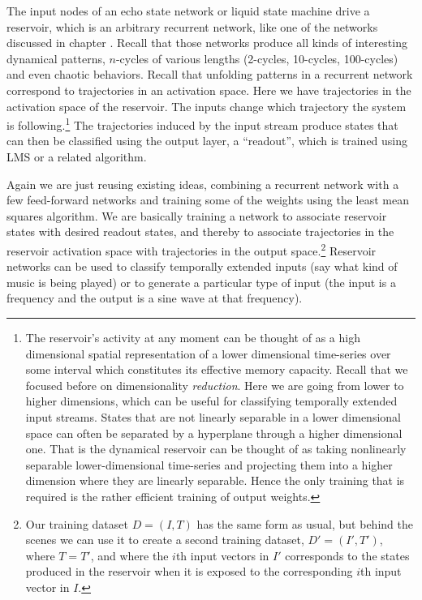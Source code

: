 
The input nodes of an echo state network or liquid state machine drive a reservoir, which is an arbitrary recurrent network, like one of the networks discussed in chapter . Recall that those networks produce all kinds of interesting dynamical patterns, \eg $n$-cycles of various lengths (2-cycles, 10-cycles, 100-cycles) and even chaotic behaviors. Recall that unfolding patterns in a recurrent network correspond to trajectories in an activation space. Here we have trajectories in the activation space of the reservoir. The inputs change which trajectory the system is following.\footnote{ The reservoir's activity at any moment can be thought of as a high dimensional spatial representation of a lower dimensional time-series over some interval which constitutes its effective memory capacity. Recall that we focused before on dimensionality \emph{reduction}. Here we are going from lower to higher dimensions, which can be useful for classifying temporally extended input streams. States that are not linearly separable in a lower dimensional space can often be separated by a hyperplane through a higher dimensional one. That is the dynamical reservoir can be thought of as taking nonlinearly separable lower-dimensional time-series and projecting them into a higher dimension where they are linearly separable. Hence the only training that is required is the rather efficient training of output weights.}  The trajectories induced by the input stream produce states that can then be classified using the output layer, a ``readout'', which is trained using LMS or a related algorithm. 

Again we are just reusing existing ideas, combining a recurrent network with a few feed-forward networks and training some of the weights using the least mean squares algorithm. We are basically training a network to associate reservoir states with desired readout states, and thereby to associate trajectories in the reservoir activation space with trajectories in the output space.\footnote{Our training dataset $D=(I,T)$ has the same form as usual, but behind the scenes we can use it to create a second training dataset, $D'=(I',T')$, where $T=T'$, and where the $i$th input vectors in $I'$ corresponds to the states produced in the reservoir when it is exposed to the corresponding $i$th input vector in $I$.}  Reservoir networks can be used to classify temporally extended inputs (\eg say what kind of music is being played) or to generate a particular type of input (\eg the input is a frequency and the output is a sine wave at that frequency). 

